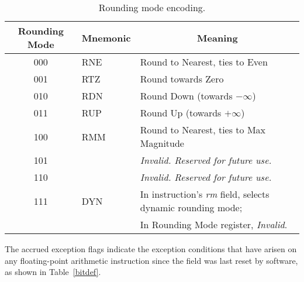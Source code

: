 \begin{table}[htp]
\begin{small}
\begin{center}
\begin{tabular}{ccl}
\hline
\multicolumn{1}{|c|}{Rounding Mode} &
\multicolumn{1}{c|}{Mnemonic} &
\multicolumn{1}{c|}{Meaning} \\
\hline
\multicolumn{1}{|c|}{000} &
\multicolumn{1}{l|}{RNE} &
\multicolumn{1}{l|}{Round to Nearest, ties to Even}\\
\hline
\multicolumn{1}{|c|}{001} &
\multicolumn{1}{l|}{RTZ} &
\multicolumn{1}{l|}{Round towards Zero}\\
\hline
\multicolumn{1}{|c|}{010} &
\multicolumn{1}{l|}{RDN} &
\multicolumn{1}{l|}{Round Down (towards $-\infty$)}\\
\hline
\multicolumn{1}{|c|}{011} &
\multicolumn{1}{l|}{RUP} &
\multicolumn{1}{l|}{Round Up (towards $+\infty$)}\\
\hline
\multicolumn{1}{|c|}{100} &
\multicolumn{1}{l|}{RMM} &
\multicolumn{1}{l|}{Round to Nearest, ties to Max Magnitude}\\
\hline
\multicolumn{1}{|c|}{101} &
\multicolumn{1}{l|}{} &
\multicolumn{1}{l|}{\em Invalid.  Reserved for future use.}\\
\hline
\multicolumn{1}{|c|}{110} &
\multicolumn{1}{l|}{} &
\multicolumn{1}{l|}{\em Invalid.  Reserved for future use.}\\
\hline
\multicolumn{1}{|c|}{111} &
\multicolumn{1}{l|}{DYN} &
\multicolumn{1}{l|}{In instruction's {\em rm} field, selects dynamic rounding mode;}\\
\multicolumn{1}{|c|}{} &
\multicolumn{1}{l|}{} &
\multicolumn{1}{l|}{In Rounding Mode register, {\em Invalid}.}\\
\hline
\end{tabular}
\end{center}
\end{small}
\caption{Rounding mode encoding.}
\label{rm}
\end{table}

The accrued exception flags indicate the exception conditions that
have arisen on any floating-point arithmetic instruction since the
field was last reset by software, as shown in Table~\ref{bitdef}.

